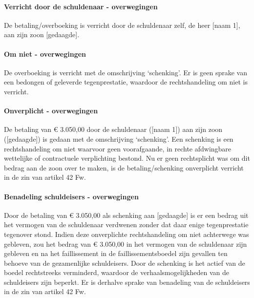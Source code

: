 \documentclass[
  dutch,
  a4paper,
]{article}
\begin{document}
\paragraph{Verricht door de schuldenaar - overwegingen}\label{verricht-door-de-schuldenaar---overwegingen-29}

De betaling/overboeking is verricht door de schuldenaar zelf, de heer {[}naam 1{]}, aan zijn zoon {[}gedaagde{]}.

\paragraph{Om niet - overwegingen}\label{om-niet---overwegingen-29}

De overboeking is verricht met de omschrijving `schenking'. Er is geen sprake van een bedongen of geleverde tegenprestatie, waardoor de rechtshandeling om niet is verricht.

\paragraph{Onverplicht - overwegingen}\label{onverplicht---overwegingen-29}

De betaling van € 3.050,00 door de schuldenaar ({[}naam 1{]}) aan zijn zoon ({[}gedaagde{]}) is gedaan met de omschrijving `schenking'. Een schenking is een rechtshandeling om niet waarvoor geen voorafgaande, in rechte afdwingbare wettelijke of contractuele verplichting bestond. Nu er geen rechtsplicht was om dit bedrag aan de zoon over te maken, is de betaling/schenking onverplicht verricht in de zin van artikel 42 Fw.

\paragraph{Benadeling schuldeisers - overwegingen}\label{benadeling-schuldeisers---overwegingen-29}

Door de betaling van € 3.050,00 als schenking aan {[}gedaagde{]} is er een bedrag uit het vermogen van de schuldenaar verdwenen zonder dat daar enige tegenprestatie tegenover stond. Indien deze onverplichte rechtshandeling om niet achterwege was gebleven, zou het bedrag van € 3.050,00 in het vermogen van de schuldenaar zijn gebleven en na het faillissement in de faillissementsboedel zijn gevallen ten behoeve van de gezamenlijke schuldeisers. Door de schenking is het actief van de boedel rechtstreeks verminderd, waardoor de verhaalsmogelijkheden van de schuldeisers zijn beperkt. Er is derhalve sprake van benadeling van de schuldeisers in de zin van artikel 42 Fw.
\end{document}
